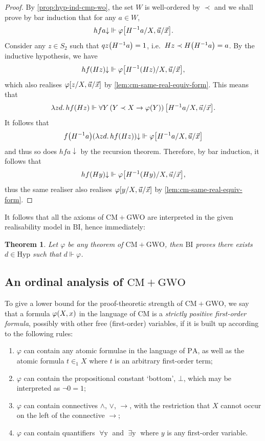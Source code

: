 \documentclass[12pt,openany]{book}
\theoremstyle{plain}
\newtheorem{theorem}{Theorem}[section]
\theoremstyle{definition}
\newcommand\uplabel[1]{\textup{(#1)}}
\newcommand\opA[1]{\mathop{\forall #1}}
\newcommand\opE[1]{\mathop{\exists #1}}
\newcommand\oplam[1]{\mathop{\lambda #1.}}
\newcommand\PA{\mathrm{PA}}
\newcommand\BI{\mathrm{BI}}
\newcommand\CM{\mathrm{CM}}
\newcommand\GWO{\mathrm{GWO}}
\newcommand\Hyp{\mathrm{Hyp}}
\begin{document}
\begin{proof}
  By \autoref{prop:hyp-ind-cmp-wo}, the set $W$ is well-ordered by $\prec$ and we shall prove by bar induction that for any $a \in W$,
  \[hfa {\downarrow} \Vdash \varphi\mleft[H^{-1} a/X, \vec{u}/\vec{x}\mright].\]
  Consider any $z \in S_2$ such that $qz \mleft(H^{-1} a\mright) = 1$, i.e.\ $Hz \prec H \mleft(H^{-1} a\mright) = a$. By the inductive hypothesis, we have
  \[hf \mleft(Hz\mright) {\downarrow} \Vdash \varphi\mleft[H^{-1} \mleft(Hz\mright)/X, \vec{u}/\vec{x}\mright],\]
  which also realises $\varphi\mleft[z/X, \vec{u}/\vec{x}\mright]$ by \autoref{lem:cm-same-real-equiv-form}. This means that
  \[\oplam{zd} hf \mleft(Hz\mright) \Vdash \opA{Y} \left(Y \prec X \rightarrow \varphi\mleft(Y\mright)\right)\mleft[H^{-1} a/X, \vec{u}/\vec{x}\mright].\]
  It follows that
  \[f \mleft(H^{-1} a\mright) \mleft(\oplam{zd} hf \mleft(Hz\mright)\mright) {\downarrow} \Vdash \varphi\mleft[H^{-1} a/X, \vec{u}/\vec{x}\mright]\]
  and thus so does $hfa {\downarrow}$ by the recursion theorem. Therefore, by bar induction, it follows that
  \[hf \mleft(Hy\mright) {\downarrow} \Vdash \varphi\mleft[H^{-1} \mleft(Hy\mright)/X, \vec{u}/\vec{x}\mright],\]
  thus the same realiser also realises $\varphi\mleft[y/X, \vec{u}/\vec{x}\mright]$ by \autoref{lem:cm-same-real-equiv-form}.
\end{proof}

It follows that all the axioms of $\CM + \GWO$ are interpreted in the given realisability model in $\BI$, hence immediately:
\begin{theorem}
  Let $\varphi$ be any theorem of $\CM + \GWO$, then $\BI$ proves there exists $d \in \Hyp$ such that $d \Vdash \varphi$.
\end{theorem}

\subsection*{An ordinal analysis of $\CM + \GWO$}

To give a lower bound for the proof-theoretic strength of $\CM + \GWO$, we say that a formula $\varphi\mleft(X, x\mright)$ in the language of $\mathrm{CM}$ is a \emph{strictly positive first-order formula}, possibly with other free (first-order) variables, if it is built up according to the following rules:
\begin{enumerate}[label=\uplabel{\arabic*}]
  \item $\varphi$ can contain any atomic formulae in the language of $\PA$, as well as the atomic formula $t \in_1 X$ where $t$ is an arbitrary first-order term;
  \item $\varphi$ can contain the propositional constant `bottom', $\bot$, which may be interpreted as $\neg 0 = 1$;
  \item $\varphi$ can contain connectives $\land$, $\lor$, $\rightarrow$, with the restriction that $X$ cannot occur on the left of the connective $\rightarrow$;
  \item $\varphi$ can contain quantifiers $\opA{y}$ and $\opE{y}$ where $y$ is any first-order variable.
\end{enumerate}
\end{document}
